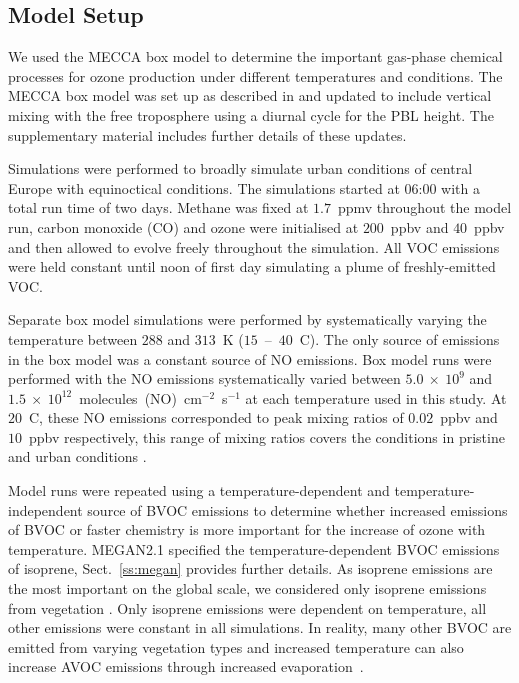 \subsection{Model Setup} \label{ss:model_setup}
We used the MECCA box model to determine the important gas-phase chemical processes for ozone production under different temperatures and  conditions.
The MECCA box model was set up as described in \citet{Coates:2015} and updated to include vertical mixing with the free troposphere using a diurnal cycle for the PBL height.
The supplementary material includes further details of these updates.

Simulations were performed to broadly simulate urban conditions of central Europe with equinoctical conditions.
The simulations started at 06:00 with a total run time of two days.
Methane was fixed at $1.7$~ppmv throughout the model run, carbon monoxide (CO) and ozone were initialised at $200$~ppbv and $40$~ppbv and then allowed to evolve freely throughout the simulation.
All VOC emissions were held constant until noon of first day simulating a plume of freshly-emitted VOC.

Separate box model simulations were performed by systematically varying the temperature between $288$ and $313$~K ($15$~--~$40$~\degree C). 
The only source of  emissions in the box model was a constant source of NO emissions. 
Box model runs were performed with the NO emissions systematically varied between $5.0~\times~10^9$ and $1.5~\times~10^{12}$~molecules~(NO)~cm$^{-2}$~s$^{-1}$ at each temperature used in this study. 
At $20$~\degree C, these NO emissions corresponded to peak  mixing ratios of $0.02$~ppbv and $10$~ppbv respectively, this range of  mixing ratios covers the  conditions in pristine and urban conditions \citep{Seinfeld:2006}. 

Model runs were repeated using a temperature-dependent and temperature-independent source of BVOC emissions to determine whether increased emissions of BVOC or faster chemistry is more important for the increase of ozone with temperature. 
MEGAN2.1 \citep{Guenther:2012} specified the temperature-dependent BVOC emissions of isoprene, Sect.~\ref{ss:megan} provides further details. 
As isoprene emissions are the most important on the global scale, we considered only isoprene emissions from vegetation \citep{Guenther:2006}. 
Only isoprene emissions were dependent on temperature, all other emissions were constant in all simulations.
In reality, many other BVOC are emitted from varying vegetation types \citep{Guenther:2006} and increased temperature can also increase AVOC emissions through increased \mbox{evaporation \citep{Rubin:2006}}.

